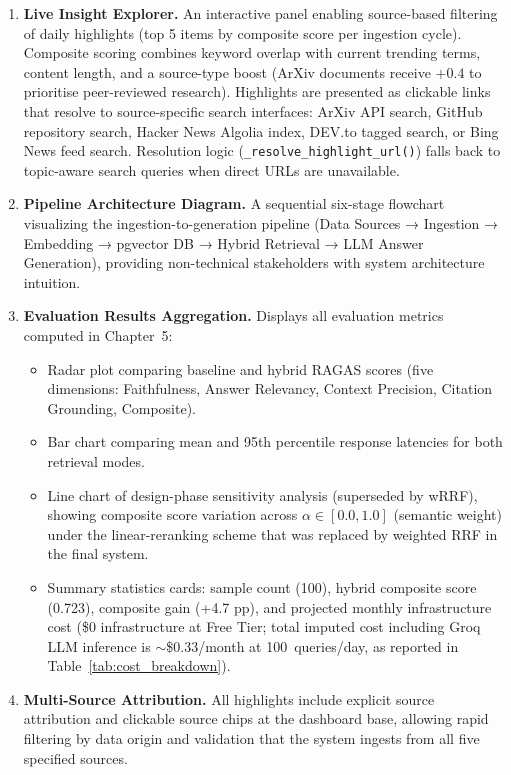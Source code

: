 \begin{enumerate}[leftmargin=0.5in]
  \item \textbf{Live Insight Explorer.} An interactive panel enabling source-based filtering of daily highlights (top 5 items by composite score per ingestion cycle). Composite scoring combines keyword overlap with current trending terms, content length, and a source-type boost (ArXiv documents receive $+0.4$ to prioritise peer-reviewed research). Highlights are presented as clickable links that resolve to source-specific search interfaces: ArXiv API search, GitHub repository search, Hacker News Algolia index, DEV.to tagged search, or Bing News feed search. Resolution logic (\texttt{\_resolve\_highlight\_url()}) falls back to topic-aware search queries when direct URLs are unavailable.

  \item \textbf{Pipeline Architecture Diagram.} A sequential six-stage flowchart visualizing the ingestion-to-generation pipeline (Data Sources → Ingestion → Embedding → pgvector DB → Hybrid Retrieval → LLM Answer Generation), providing non-technical stakeholders with system architecture intuition.

  \item \textbf{Evaluation Results Aggregation.} Displays all evaluation metrics computed in Chapter~5:
  \begin{itemize}
    \item Radar plot comparing baseline and hybrid RAGAS scores (five dimensions: Faithfulness, Answer Relevancy, Context Precision, Citation Grounding, Composite).
    \item Bar chart comparing mean and 95th percentile response latencies for both retrieval modes.
    \item Line chart of design-phase sensitivity analysis (superseded by wRRF), showing composite score variation across $\alpha \in [0.0, 1.0]$ (semantic weight) under the linear-reranking scheme that was replaced by weighted RRF in the final system.
    \item Summary statistics cards: sample count (100), hybrid composite score (0.723), composite gain (+4.7 pp), and projected monthly infrastructure cost (\$0 infrastructure at Free Tier; total imputed cost including Groq LLM inference is $\sim$\$0.33/month at 100~queries/day, as reported in Table~\ref{tab:cost_breakdown}).
  \end{itemize}

  \item \textbf{Multi-Source Attribution.} All highlights include explicit source attribution and clickable source chips at the dashboard base, allowing rapid filtering by data origin and validation that the system ingests from all five specified sources.
\end{enumerate}

